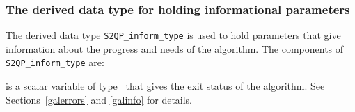\documentclass{galahad}
\newcommand{\packagename}{S2QP}
\begin{document}

\subsubsection{The derived data type for holding informational
 parameters}\label{typeinform}
The derived data type 
{\tt \packagename\_inform\_type} 
is used to hold parameters that give information about the progress and needs 
of the algorithm. The components of
{\tt \packagename\_inform\_type} 
are:

\begin{description}
 is a scalar variable of type \integer\ that gives the
exit status of the algorithm. See Sections~\ref{galerrors} and \ref{galinfo}
for details.
\end{description}

\end{document}
